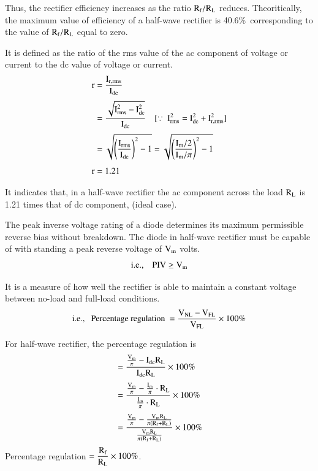 Thus, the rectifier efficiency increases as the ratio $\textrm{R}_{\textrm{f}}/\textrm{R}_{\textrm{L}}$ reduces. Theoritically, the maximum value of efficiency of a half-wave rectifier is 40.6\%\ corresponding to the value of $\textrm{R}_{\textrm{f}}/\textrm{R}_{\textrm{L}}$ equal to zero.

\eject

 It is defined as the ratio of the rms value of the ac component of voltage or current to the dc value of voltage or current.
\begin{align*}
\textrm{r} &= \frac{\textrm{I}_{\textrm{r}, \text{rms}}}{\textrm{I}_{\text{dc}}}\\[3pt]
&= \frac{\sqrt{\textrm{I}^{2}_{\text{rms}}-\textrm{I}^{2}_{\text{dc}}}}{\textrm{I}_{\text{dc}}}\quad [\because \ \textrm{I}^{2}_{\text{rms}}=\textrm{I}^{2}_{\text{dc}}+\textrm{I}^{2}_{\textrm{r},\text{rms}}]\\[3pt]
&= \sqrt{\left(\frac{\textrm{I}_{\text{rms}}}{\textrm{I}_{\text{dc}}}\right)^{2}-1}= \sqrt{\left(\frac{\textrm{I}_{\textrm{m}}/2}{\textrm{I}_{\textrm{m}}/\pi}\right)^{2}-1}\\[3pt]
\textrm{r} &= 1.21
\end{align*}

It indicates that, in a half-wave rectifier the ac component across the load $\textrm{R}_{\textrm{L}}$ is 1.21 times that of dc component, (ideal case).

\smallskip
{} The peak inverse voltage rating of a diode determines its maximum permissible reverse bias without breakdown. The diode in half-wave rectifier must be capable of with standing a peak reverse voltage of $\textrm{V}_{\textrm{m}}$ volts.
$$
\text{i.e.,}\quad \text{PIV} \geq \textrm{V}_{\textrm{m}}
$$

\smallskip
{} It is a measure of how well the rectifier is able to maintain a constant voltage between no-load and full-load conditions.
$$
\text{i.e.,~~ Percentage regulation } = \frac{\textrm{V}_{\text{NL}}-\textrm{V}_{\text{FL}}}{\textrm{V}_{\text{FL}}}\times 100\%
$$

For half-wave rectifier, the percentage regulation is
\begin{align*}
&= \frac{\frac{\textrm{V}_{\textrm{m}}}{\pi}-\textrm{I}_{\text{dc}}\textrm{R}_{\textrm{L}}}{\textrm{I}_{\text{dc}}\textrm{R}_{\textrm{L}}}\times 100\%\\[3pt]
&= \frac{\frac{\textrm{V}_{\textrm{m}}}{\pi}-\frac{\textrm{I}_{\textrm{m}}}{\pi}\cdot \textrm{R}_{\textrm{L}}}{\frac{\textrm{I}_{\textrm{m}}}{\pi}\cdot \textrm{R}_{\textrm{L}}}\times 100\%\\[3pt]
&= \frac{\frac{\textrm{V}_{\textrm{m}}}{\pi}-\frac{\textrm{V}_{\textrm{m}}\textrm{R}_{\textrm{L}}}{\pi(\textrm{R}_{\textrm{f}}+\textrm{R}_{\textrm{L}})}}{\frac{\textrm{V}_{\textrm{m}}\textrm{R}_{\textrm{L}}}{\pi(\textrm{R}_{\textrm{f}}+\textrm{R}_{\textrm{L}})}}\times 100\%
\end{align*}
Percentage regulation $=\dfrac{\textrm{R}_{\textrm{f}}}{\textrm{R}_{\textrm{L}}}\times 100\%$.

